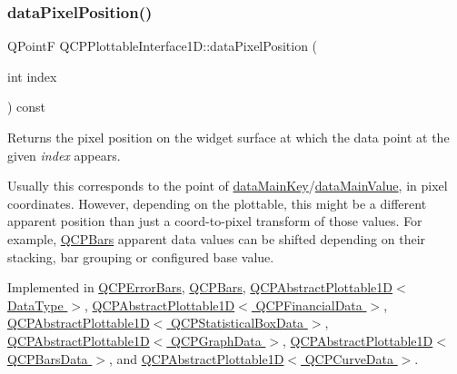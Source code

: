 \mbox{\label{classQCPPlottableInterface1D_a78911838cfbcfd2d8df9ad2fdbfb8e93}} 
\subsubsection{\texorpdfstring{data\+Pixel\+Position()}{dataPixelPosition()}}
{\footnotesize\ttfamily Q\+PointF Q\+C\+P\+Plottable\+Interface1\+D\+::data\+Pixel\+Position (\begin{DoxyParamCaption}\item[{int}]{index }\end{DoxyParamCaption}) const\hspace{0.3cm}{\ttfamily [pure virtual]}}

Returns the pixel position on the widget surface at which the data point at the given {\itshape index} appears.

Usually this corresponds to the point of \hyperlink{classQCPPlottableInterface1D_a2bd60daaac046945fead558cbd83cf73}{data\+Main\+Key}/\hyperlink{classQCPPlottableInterface1D_af6330919e8023277d08c958a6074fc76}{data\+Main\+Value}, in pixel coordinates. However, depending on the plottable, this might be a different apparent position than just a coord-\/to-\/pixel transform of those values. For example, \hyperlink{classQCPBars}{Q\+C\+P\+Bars} apparent data values can be shifted depending on their stacking, bar grouping or configured base value. 

Implemented in \hyperlink{classQCPErrorBars_ae79fed6566f1912a97344b20b35faac1}{Q\+C\+P\+Error\+Bars}, \hyperlink{classQCPBars_a55cdaf565cd3384158d1f7f89533bc2d}{Q\+C\+P\+Bars}, \hyperlink{classQCPAbstractPlottable1D_a6ca0699a6af5f25a7565de7c50ce13b2}{Q\+C\+P\+Abstract\+Plottable1\+D$<$ Data\+Type $>$}, \hyperlink{classQCPAbstractPlottable1D_a6ca0699a6af5f25a7565de7c50ce13b2}{Q\+C\+P\+Abstract\+Plottable1\+D$<$ Q\+C\+P\+Financial\+Data $>$}, \hyperlink{classQCPAbstractPlottable1D_a6ca0699a6af5f25a7565de7c50ce13b2}{Q\+C\+P\+Abstract\+Plottable1\+D$<$ Q\+C\+P\+Statistical\+Box\+Data $>$}, \hyperlink{classQCPAbstractPlottable1D_a6ca0699a6af5f25a7565de7c50ce13b2}{Q\+C\+P\+Abstract\+Plottable1\+D$<$ Q\+C\+P\+Graph\+Data $>$}, \hyperlink{classQCPAbstractPlottable1D_a6ca0699a6af5f25a7565de7c50ce13b2}{Q\+C\+P\+Abstract\+Plottable1\+D$<$ Q\+C\+P\+Bars\+Data $>$}, and \hyperlink{classQCPAbstractPlottable1D_a6ca0699a6af5f25a7565de7c50ce13b2}{Q\+C\+P\+Abstract\+Plottable1\+D$<$ Q\+C\+P\+Curve\+Data $>$}.

